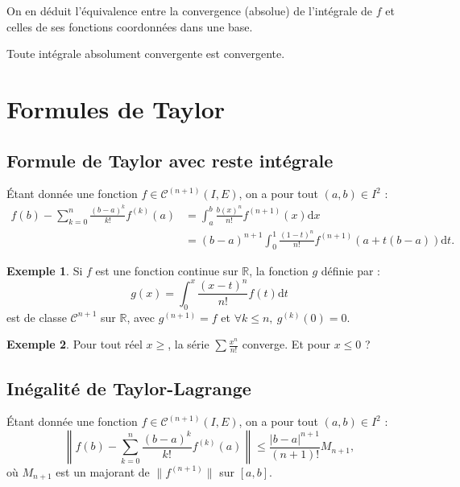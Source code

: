 \documentclass[french]{article}
\newcommand{\R}{\mathbb{R}}
\renewcommand{\d}{\text{d}}
\theoremstyle{plain}
\theoremstyle{definition}
\newtheorem*{ex}{Exemple}
\theoremstyle{remark}
\begin{document}
On en déduit l'équivalence entre la convergence (absolue) de l'intégrale de $f$ et celles de ses fonctions coordonnées dans une base.

\begin{thm}%
	Toute intégrale absolument convergente est convergente.
\end{thm}

\section{Formules de Taylor}

\subsection{Formule de Taylor avec reste intégrale}

\begin{thm}%
	Étant donnée une fonction $f\in\mathcal{C}^{(n+1)}(I,E)$, on a pour tout $(a,b)\in I^2$ :
	\begin{align*}
		f(b)-\sum_{k=0}^{n}\frac{(b-a)^k}{k!}f^{(k)}(a)&=\int_{a}^{b}\frac{b(x)^n}{n!}f^{(n+1)}(x)\d x \\
		&=(b-a)^{n+1}\int_{0}^{1}\frac{(1-t)^n}{n!}f^{(n+1)}(a+t(b-a))\d t.
	\end{align*}
\end{thm}

\begin{ex}
	Si $f$ est une fonction continue sur $\R$, la fonction $g$ définie par :
	$$g(x)=\int_{0}^{x}\frac{(x-t)^n}{n!}f(t)\d t$$
	est de classe $\mathcal{C}^{n+1}$ sur $\R$, avec $g^{(n+1)}=f$ et $\forall k\leqslant n,\ g^{(k)}(0)=0$.
\end{ex}

\begin{ex}
	Pour tout réel $x\geqslant$, la série $\displaystyle\sum\frac{x^n}{n!}$ converge. Et pour $x\leqslant 0$ ?
\end{ex}

\subsection{Inégalité de Taylor-Lagrange}

\begin{thm}%
	Étant donnée une fonction $f\in\mathcal{C}^{(n+1)}(I,E)$, on a pour tout $(a,b)\in I^2$ :
	$$\left\lVert f(b)-\sum_{k=0}^{n}\frac{(b-a)^k}{k!}f^{(k)}(a)\right\rVert\leqslant\frac{\lvert b-a\rvert^{n+1}}{(n+1)!}M_{n+1},$$
	où $M_{n+1}$ est un majorant de $\lVert f^{(n+1)}\rVert$ sur $[a,b]$.
\end{thm}
\end{document}
